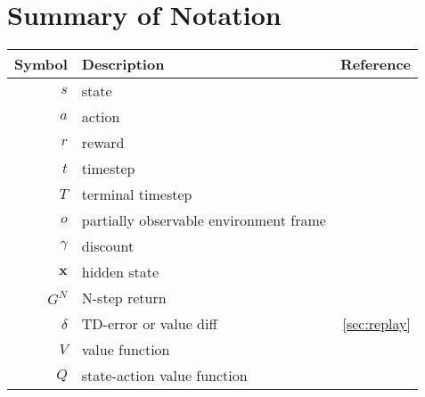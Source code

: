 \section{Summary of Notation}

\begin{tabular}{| r  l  r |}
    \hline
    \textbf{Symbol} & \textbf{Description}                   & \textbf{Reference}                       \\
    \hline
    $s$             & state                                                                             \\
    $a$             & action                                                                            \\
    $r$             & reward                                                                            \\
    $t$             & timestep                                                                          \\
    $T$             & terminal timestep                                                                 \\
    $o$             & partially observable environment frame                                            \\
    $\gamma$        & discount                                                                          \\
    $\mathbf{x}$    & hidden state                                                                      \\
    $G^N$           & N-step return                                                                     \\
    $\delta$        & TD-error or value diff                 & \ref{sec:replay}                         \\
    $V$             & value function                                                                    \\
    $Q$             & state-action value function                                                       \\

\end{tabular}
